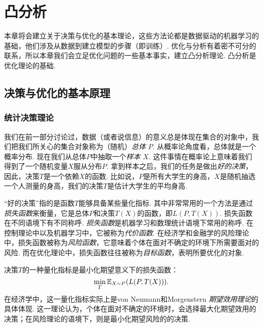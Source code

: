 \chapter{凸分析}\label{chap:convex-analysis}

本章将会建立关于决策与优化的基本理论，这些方法论都是数据驱动的机器学习的基础，他们涉及从数据到建立模型的步骤（即训练）. 优化与分析有着密不可分的联系，所以本章我们会立足优化问题的一些基本事实，建立凸分析理论. 凸分析是优化理论的基础.

\section{决策与优化的基本原理}
\subsection{统计决策理论}

我们在前一部分讨论过，数据（或者说信息）的意义总是体现在集合的对象中，我们把我们所关心的集合对象称为（随机）\emph{总体} $P$. 从概率论角度看，总体就是一个概率分布. 现在我们从总体$P$中抽取一个\emph{样本} $X$. 这件事情在概率论上意味着我们得到了一个随机变量$X$服从分布$P$. 拿到样本之后，我们的任务是做出\emph{好的决策}，因此，决策$T$是一个依赖$X$的函数. 比如说，$P$是所有大学生的身高，$X$是随机抽选一个人测量的身高，我们的决策$T$是估计大学生的平均身高. 

“好的决策”指的是函数$T$能够具备某些量化指标. 其中非常常用的一个方法是通过\emph{损失函数}来衡量，它是总体$P$和决策$T(X)$的函数，即$L(P,T(X))$. 损失函数在不同语境下有不同称呼. \emph{损失函数}是机器学习和数理统计语境下常用的称呼. 在控制理论中以及机器学习中，它被称为\emph{代价函数}. 在经济学和金融学的风险理论中，损失函数被称为\emph{风险函数}，它意味着个体在面对不确定的环境下所需要面对的风险. 而在优化理论中，损失函数往往被称为\emph{目标函数}，表明所要优化的对象. 

决策$T$的一种量化指标是最小化期望意义下的损失函数：
    \[\min_{T}\mathbb{E}_{X\sim P}(L(P,T(X))).\]
在经济学中，这一量化指标实际上是von Neumann和Morgenstern \emph{期望效用理论}的具体体现. 这一理论认为，个体在面对不确定的环境时，会选择最大化期望效用的决策；在风险理论的语境下，则是最小化期望风险的的决策. 


